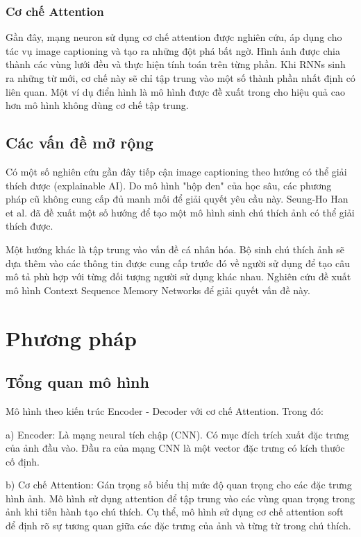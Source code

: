 \documentclass[conference]{IEEEtran}
\begin{document}
\subsubsection{Cơ chế Attention} 
Gần đây, mạng neuron sử dụng cơ chế attention được nghiên cứu, áp dụng cho tác vụ image captioning và tạo ra những đột phá bất ngờ.
Hình ảnh được chia thành các vùng lưới đều và thực hiện tính toán trên từng phần.
Khi RNNs sinh ra những từ mới, cơ chế này sẽ chỉ tập trung vào một số thành phần nhất định có liên quan.
Một ví dụ điển hình là mô hình được đề xuất trong \cite{yan2020image} cho hiệu quả cao hơn mô hình không dùng cơ chế tập trung.


\subsection{Các vấn đề mở rộng}
Có một số nghiên cứu gần đây tiếp cận image captioning theo hướng có thể giải thích được (explainable AI). Do mô hình "hộp đen" của học sâu, các phương pháp cũ không cung cấp đủ manh mối để giải quyết yêu cầu này. Seung-Ho Han et al. \cite{han2020explainable} đã đề xuất một số hướng để tạo một mô hình sinh chú thích ảnh có thể giải thích được.

Một hướng khác là tập trung vào vấn đề cá nhân hóa. Bộ sinh chú thích ảnh sẽ dựa thêm vào các thông tin được cung cấp trước đó về người sử dụng để tạo câu mô tả phù hợp với từng đối tượng người sử dụng khác nhau. Nghiên cứu \cite{chunseong2017attend} đề xuất mô hình Context Sequence Memory Networks để giải quyết vấn đề này.

\section{Phương pháp\label{method}}
\subsection{Tổng quan mô hình}
Mô hình theo kiến trúc Encoder - Decoder với cơ chế Attention. Trong đó:

a) Encoder: Là mạng neural tích chập (CNN). Có mục đích trích xuất đặc trưng của ảnh đầu vào. Đầu ra của mạng CNN là một vector đặc trưng có kích thước cố định.

b) Cơ chế Attention: Gán trọng số biểu thị mức độ quan trọng cho các đặc trưng hình ảnh. Mô hình sử dụng attention để tập trung vào các vùng quan trọng trong ảnh khi tiến hành tạo chú thích. Cụ thể, mô hình sử dụng cơ chế attention soft để định rõ sự tương quan giữa các đặc trưng của ảnh và từng từ trong chú thích.
\end{document}
